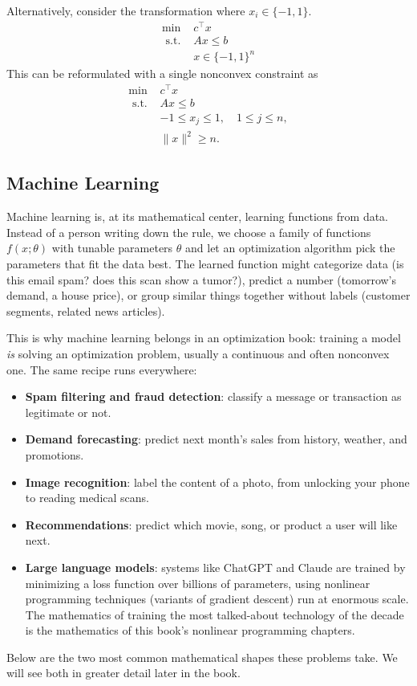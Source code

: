 Alternatively, consider the transformation where $x_i \in \{-1,1\}$.
$$
\begin{aligned}
\min & c^\top x \\
\text { s.t. } & A x \leq b \\
& x \in \{-1,1\}^n
\end{aligned}
$$
This can be reformulated with a single nonconvex constraint as
$$
\begin{array}{cl}
\min & c^\top x \\
\text { s.t. } & A x \leq b \\
& -1 \leq x_j \leq 1, \quad 1 \leq j \leq n, \\
& \|x\|^2\geq n .
\end{array}
$$

\subsection{Machine Learning}

Machine learning is, at its mathematical center, learning functions from data.  Instead of a person writing down the rule, we choose a family of functions $f(x;\theta)$ with tunable parameters $\theta$ and let an optimization algorithm pick the parameters that fit the data best.  The learned function might categorize data (is this email spam? does this scan show a tumor?), predict a number (tomorrow's demand, a house price), or group similar things together without labels (customer segments, related news articles).

This is why machine learning belongs in an optimization book: training a model \emph{is} solving an optimization problem, usually a continuous and often nonconvex one.  The same recipe runs everywhere:
\begin{itemize}
\item \textbf{Spam filtering and fraud detection}: classify a message or transaction as legitimate or not.
\item \textbf{Demand forecasting}: predict next month's sales from history, weather, and promotions.
\item \textbf{Image recognition}: label the content of a photo, from unlocking your phone to reading medical scans.
\item \textbf{Recommendations}: predict which movie, song, or product a user will like next.
\item \textbf{Large language models}: systems like ChatGPT and Claude are trained by minimizing a loss function over billions of parameters, using nonlinear programming techniques (variants of gradient descent) run at enormous scale.  The mathematics of training the most talked-about technology of the decade is the mathematics of this book's nonlinear programming chapters.
\end{itemize}
Below are the two most common mathematical shapes these problems take.  We will see both in greater detail later in the book.

